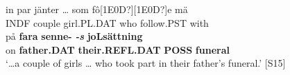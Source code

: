 

 \ea\label{}
\gll in  par  jänter  …  som  fô[1E0D?][1E0D?]e  mä\\


INDF  couple  girl.PL.DAT    who  follow.PST  with\\

 \ea\label{}
\gll på  \textbf{fara} \textbf{senne-}\textbf{\textit{  }}\textbf{\textit{\nobreakdash-s}} \textbf{joLsättning} \\


on  \textbf{father.DAT} \textbf{their.REFL.DAT} \textbf{POSS} \textbf{funeral} \\

\glt ‘…a couple of girls … who took part in their father’s funeral.’ [S15]

\z


